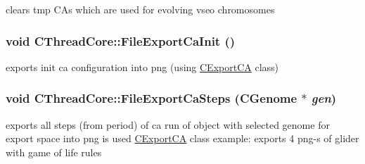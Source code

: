 \label{classCThreadCore_a6a70230547c401faba79d362df341bae}
clears tmp CAs which are used for evolving vseo chromosomes \hypertarget{classCThreadCore_a8a25b573f3189377f4f34b75a65dd063}{
\subsubsection[{FileExportCaInit}]{\setlength{\rightskip}{0pt plus 5cm}void CThreadCore::FileExportCaInit ()}}
\label{classCThreadCore_a8a25b573f3189377f4f34b75a65dd063}
exports init ca configuration into png (using \hyperlink{classCExportCA}{CExportCA} class) \hypertarget{classCThreadCore_a25cbacbf0e0c79aab05aee3a41a1043f}{
\subsubsection[{FileExportCaSteps}]{\setlength{\rightskip}{0pt plus 5cm}void CThreadCore::FileExportCaSteps ({\bf CGenome} $\ast$ {\em gen})}}
\label{classCThreadCore_a25cbacbf0e0c79aab05aee3a41a1043f}
exports all steps (from period) of ca run of object with selected genome for export space into png is used \hyperlink{classCExportCA}{CExportCA} class example: exports 4 png-\/s of glider with game of life rules



